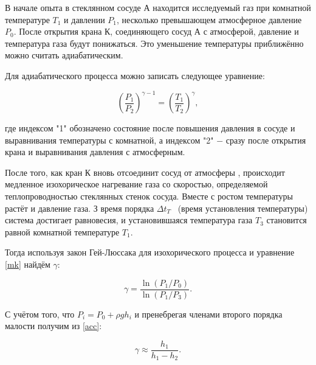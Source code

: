 \documentclass[a4paper, 12pt]{article}
\begin{document}
		В начале опыта  в стеклянном сосуде А находится исследуемый газ при комнатной температуре $T_1$ и давлении $P_1$, несколько превышающем атмосферное давление  $P_0$. После открытия крана К, соединяющего сосуд А с атмосферой, давление и температура газа будут понижаться. Это уменьшение температуры приближённо можно считать адиабатическим.

		Для адиабатического процесса можно записать следующее уравнение:

		\begin{equation}\label{mk}
		\left(\dfrac{P_1}{P_2}\right)^{\gamma - 1} = \left(\dfrac{T_1}{T_2}\right)^\gamma ,
		\end{equation}

		где индексом "1" обозначено состояние после повышения давления в сосуде и выравнивания температуры с комнатной, а индексом "2"  $-$ сразу после открытия крана и выравнивания давления с атмосферным.

		После того, как кран К вновь отсоединит сосуд от атмосферы , происходит медленное изохорическое нагревание газа со скоростью, определяемой теплопроводностью стеклянных стенок сосуда. Вместе с ростом температуры растёт и давление газа. З время порядка $\Delta t_T$  (время установления температуры) система достигает равновесия, и установившаяся температура газа $T_3$ становится равной комнатной температуре $T_1$.

		Тогда используя закон Гей-Люссака для изохорического процесса и уравнение \eqref{mk} найдём $\gamma$:

		\begin{equation}\label{acc}
		\gamma = \dfrac{\ln(P_1 / P_0)}{\ln (P_1 / P_3)}.
		\end{equation}

		С учётом того, что $P_i = P_0 + \rho g h_i$ и пренебрегая членами второго порядка малости получим из \eqref{acc}:

		\begin{equation}\label{r}
		\gamma \approx \dfrac{h_1}{h_1 - h_2}.
		\end{equation}
\end{document}
